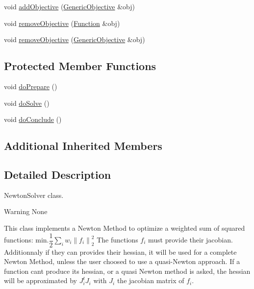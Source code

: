{\bf }\par
\begin{DoxyCompactItemize}
\item 
void \hyperlink{classocra_1_1NewtonSolver_a312cf17ad5b175d29a0fd7424449d630}{add\+Objective} (\hyperlink{namespaceocra_a37a91885f4fa5c523d22cb15d5673062}{Generic\+Objective} \&obj)
\item 
void \hyperlink{classocra_1_1NewtonSolver_a0f2c1366ef076469735020c20f759dd6}{remove\+Objective} (\hyperlink{classocra_1_1Function}{Function} \&obj)
\item 
void \hyperlink{classocra_1_1NewtonSolver_a99308db30e18ed33f7797c308e03ff92}{remove\+Objective} (\hyperlink{namespaceocra_a37a91885f4fa5c523d22cb15d5673062}{Generic\+Objective} \&obj)
\end{DoxyCompactItemize}

\subsection*{Protected Member Functions}
\begin{DoxyCompactItemize}
\item 
void \hyperlink{classocra_1_1NewtonSolver_af717009e42a86f10a793f172883cc93d}{do\+Prepare} ()
\item 
void \hyperlink{classocra_1_1NewtonSolver_ac49e1e33eb86cb15ac505e638c2fccb9}{do\+Solve} ()
\item 
void \hyperlink{classocra_1_1NewtonSolver_ae356c90b0931d0cf3571039e52647ef4}{do\+Conclude} ()
\end{DoxyCompactItemize}
\subsection*{Additional Inherited Members}


\subsection{Detailed Description}
Newton\+Solver class. 

\begin{DoxyWarning}{Warning}
None
\end{DoxyWarning}
This class implements a Newton Method to optimize a weighted sum of squared functions\+: $ \mbox{min.} \dfrac{1}{2} \sum_i{ w_i \left\| f_i \right\|^2_2} $ The functions $ f_i $ must provide their jacobian. Additionnaly if they can provides their hessian, it will be used for a complete Newton Method, unless the user choosed to use a quasi-\/\+Newton approach. If a function can\textquotesingle{}t produce its hessian, or a quasi Newton method is asked, the hessian will be approximated by $ J_i^t J_i $ with $ J_i $ the jacobian matrix of $ f_i $.

